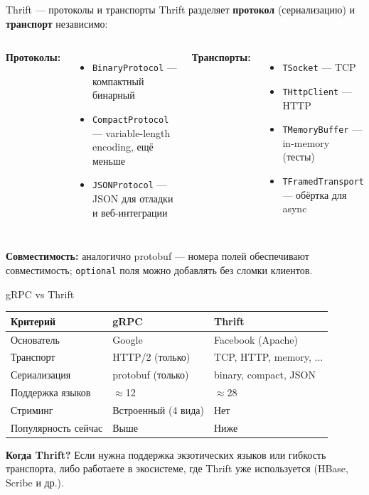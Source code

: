 \documentclass{beamer}
\begin{document}
\begin{frame}{Thrift --- протоколы и транспорты}
Thrift разделяет \textbf{протокол} (сериализацию) и \textbf{транспорт} независимо:
\begin{columns}
\textbf{Протоколы:}
\begin{itemize}
  \item \texttt{BinaryProtocol} --- компактный бинарный
  \item \texttt{CompactProtocol} --- variable-length encoding, ещё меньше
  \item \texttt{JSONProtocol} --- JSON для отладки и веб-интеграции
\end{itemize}

\textbf{Транспорты:}
\begin{itemize}
  \item \texttt{TSocket} --- TCP
  \item \texttt{THttpClient} --- HTTP
  \item \texttt{TMemoryBuffer} --- in-memory (тесты)
  \item \texttt{TFramedTransport} --- обёртка для async
\end{itemize}
\end{columns}
\vspace{0.3cm}
\textbf{Совместимость:} аналогично protobuf --- номера полей обеспечивают совместимость; \texttt{optional} поля можно добавлять без сломки клиентов.
\end{frame}

\begin{frame}{gRPC vs Thrift}
\begin{center}
\begin{tabular}{lll}
\textbf{Критерий}       & \textbf{gRPC}         & \textbf{Thrift}            \\ \hline
Основатель              & Google                & Facebook (Apache)          \\
Транспорт               & HTTP/2 (только)       & TCP, HTTP, memory, ...     \\
Сериализация            & protobuf (только)     & binary, compact, JSON      \\
Поддержка языков        & $\approx$12           & $\approx$28                \\
Стриминг                & Встроенный (4 вида)   & Нет                        \\
Популярность сейчас     & Выше                  & Ниже                       \\
\end{tabular}
\end{center}
\vspace{0.3cm}
\textbf{Когда Thrift?} Если нужна поддержка экзотических языков или гибкость транспорта, либо работаете в экосистеме, где Thrift уже используется (HBase, Scribe и др.).
\end{frame}
\end{document}

